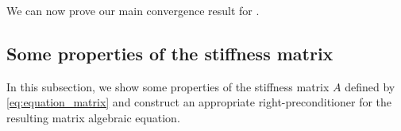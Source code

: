 \documentclass{amsart}
\theoremstyle{definition}
\theoremstyle{remark}
\numberwithin{equation}{section}
\begin{document}
We can now prove our main convergence result for .

\subsection{Some properties of the stiffness matrix}

In this subsection, we show some properties of the stiffness matrix \(A\) defined by \eqref{eq:equation_matrix} and construct an appropriate  right-preconditioner for the resulting matrix algebraic equation.
\end{document}
